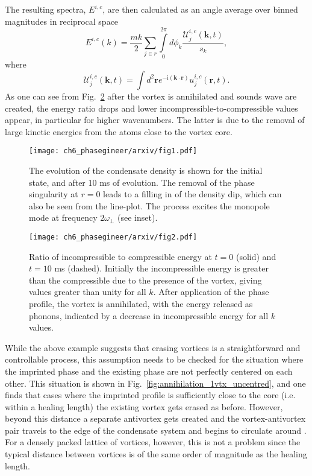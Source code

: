 The resulting spectra, $E^{i,c}$, are then calculated as an angle average over binned magnitudes in reciprocal space \cite{VTX:Bradley_prx_2012}
\begin{equation}
    E^{i,c}(k) = \frac{mk}{2}\displaystyle\sum_{j\in r}\int\limits_{0}^{2\pi} d\phi_k \frac{\mathcal{U}^{i,c}_j(\mathbf{k},t)}{s_k},
\end{equation}
where
\begin{equation}
    \mathcal{U}^{i,c}_{j}(\mathbf{k},t) = \int d^2\mathbf{r}e^{-\text{i}(\mathbf{k}\cdot \mathbf{r})}u_j^{i,c}(\mathbf{r},t).
\end{equation}
As one can see from Fig.~\ref{fig:kinspec} after the vortex is annihilated and sounds wave are created, the energy ratio drops and lower incompressible-to-compressible values appear, in particular for higher wavenumbers. The latter is due to the removal of large kinetic energies from the atoms close to the vortex core.

\begin{figure}[h!]\centering
    \texttt{[image: ch6\_phasegineer/arxiv/fig1.pdf]}
    \caption{The evolution of the condensate density is shown for the initial state, and after 10 ms of evolution. The removal of the phase singularity at $r=0$ leads to a filling in of the density dip, which can also be seen from the line-plot. The process excites the monopole mode at frequency $2\omega_\perp$ (see inset).}\label{fig:annihilation_1vtx}
\end{figure}
\begin{figure}[h!]\centering
    \texttt{[image: ch6\_phasegineer/arxiv/fig2.pdf]}
    \caption{Ratio of incompressible to compressible energy at  $t=0$ (solid) and $t=10$ ms (dashed). Initially the incompressible energy is greater than the compressible due to the presence of the vortex, giving values greater than unity for all $k$. After application of the phase profile, the vortex is annihilated, with the energy released as phonons, indicated by a decrease in incompressible energy for all $k$ values.}\label{fig:kinspec}
\end{figure}

While the above example suggests that erasing vortices is a straightforward and controllable process, this assumption needs to be checked for the situation where the imprinted phase and the existing phase are not perfectly centered on each other. This situation is shown in Fig.~\ref{fig:annihilation_1vtx_uncentred}, and one finds that cases where the imprinted profile is sufficiently close to the core (i.e. within a healing length) the existing vortex gets erased as before. However, beyond this distance a separate antivortex gets created and the vortex-antivortex pair travels to the edge of the condensate system and begins to circulate around \cite{VTX:Martikainen_pra_2001}. For a densely packed lattice of vortices, however, this is not a problem since the typical distance between vortices is of the same order of magnitude as the healing length.

